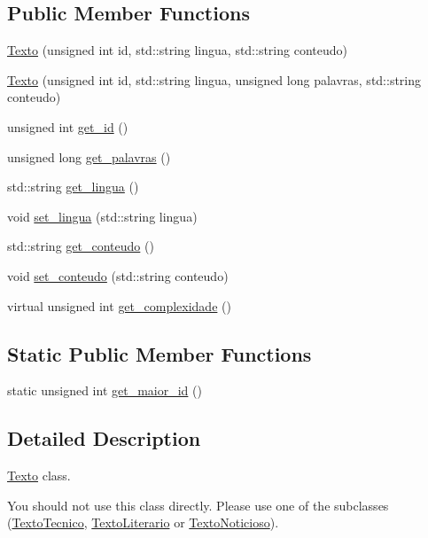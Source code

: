 \subsection*{Public Member Functions}
\begin{DoxyCompactItemize}
\item 
\hyperlink{class_texto_a7034548c1e8e2007b0825ef3a01b1b88}{Texto} (unsigned int id, std\-::string lingua, std\-::string conteudo)
\item 
\hyperlink{class_texto_a3ccc9eb8eb980eda5e5f6583cbb60425}{Texto} (unsigned int id, std\-::string lingua, unsigned long palavras, std\-::string conteudo)
\item 
unsigned int \hyperlink{class_texto_a4e1b7a020c3b1cffe4518937cdd6f565}{get\-\_\-id} ()
\item 
unsigned long \hyperlink{class_texto_a249af46529ab15e98103f1ebe9c3cabb}{get\-\_\-palavras} ()
\item 
std\-::string \hyperlink{class_texto_adfaca963b37bef9a739def84e2c810b6}{get\-\_\-lingua} ()
\item 
void \hyperlink{class_texto_a297021cc2780c0bf398119bf0e4977e0}{set\-\_\-lingua} (std\-::string lingua)
\item 
std\-::string \hyperlink{class_texto_a01a9590011195b1a258e2d3bd247ceb0}{get\-\_\-conteudo} ()
\item 
void \hyperlink{class_texto_a94ae33fe47a0ef32a5761a12e097910d}{set\-\_\-conteudo} (std\-::string conteudo)
\item 
virtual unsigned int \hyperlink{class_texto_aebb31cd3a54949bf24016e65a4b86336}{get\-\_\-complexidade} ()
\end{DoxyCompactItemize}
\subsection*{Static Public Member Functions}
\begin{DoxyCompactItemize}
\item 
static unsigned int \hyperlink{class_texto_a674eed23fb437d4f07634f9d6559d325}{get\-\_\-maior\-\_\-id} ()
\end{DoxyCompactItemize}


\subsection{Detailed Description}
\hyperlink{class_texto}{Texto} class. 

You should not use this class directly. Please use one of the subclasses (\hyperlink{class_texto_tecnico}{Texto\-Tecnico}, \hyperlink{class_texto_literario}{Texto\-Literario} or \hyperlink{class_texto_noticioso}{Texto\-Noticioso}). 

